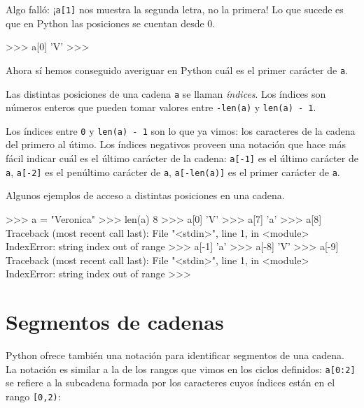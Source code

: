 Algo falló: ¡\lstinline+a[1]+ nos muestra la segunda letra, no la
primera! Lo que sucede es que en Python las posiciones se cuentan
desde 0.

\begin{codigo-python-sn}
>>> a[0]
'V'
>>>
\end{codigo-python-sn}

Ahora sí hemos conseguido averiguar en Python cuál es el primer carácter de
\lstinline!a!.

\begin{atencion}
Las distintas posiciones de una cadena \lstinline!a! se llaman
{\it índices}. Los índices son números enteros que pueden tomar
valores entre \lstinline!-len(a)! y \lstinline!len(a) - 1!.

Los índices entre \lstinline!0! y \lstinline!len(a) - 1! son lo que ya
vimos: los caracteres de la cadena del primero al útimo. Los índices
negativos proveen una notación que hace más fácil indicar cuál es el último
carácter de la cadena: \lstinline!a[-1]! es el último carácter de
\lstinline!a!, \lstinline!a[-2]! es el penúltimo carácter de \lstinline!a!,
\lstinline!a[-len(a)]! es el primer carácter de \lstinline!a!.
\end{atencion}

Algunos ejemplos de acceso a distintas posiciones en una cadena.

\begin{codigo-python-sn}
>>> a = "Veronica"
>>> len(a)
8
>>> a[0]
'V'
>>> a[7]
'a'
>>> a[8]
Traceback (most recent call last):
  File "<stdin>", line 1, in <module>
IndexError: string index out of range
>>> a[-1]
'a'
>>> a[-8]
'V'
>>> a[-9]
Traceback (most recent call last):
  File "<stdin>", line 1, in <module>
IndexError: string index out of range
>>>
\end{codigo-python-sn}


\section{Segmentos de cadenas}

Python ofrece también una notación para identificar segmentos de una
cadena. La notación es similar a la de los rangos que vimos en los ciclos
definidos: \lstinline+a[0:2]+ se refiere a la subcadena formada por los
caracteres cuyos índices están en el rango \lstinline+[0,2)+:

